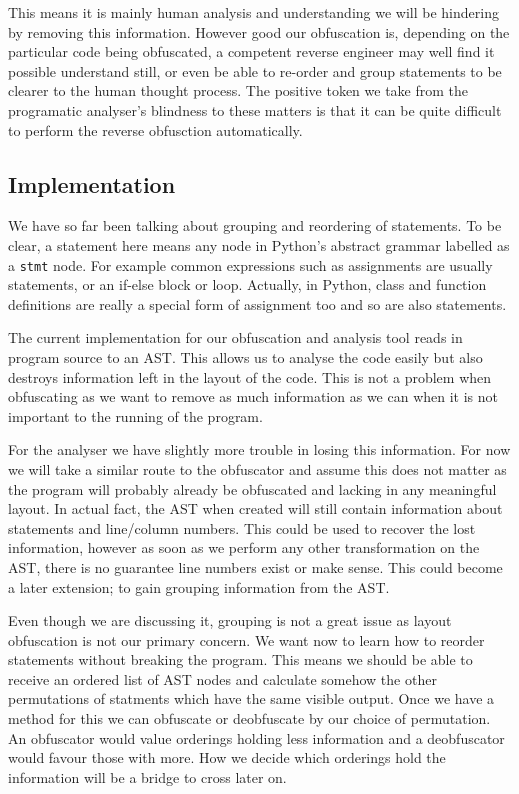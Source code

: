 \documentclass{report}
\begin{document}
This means it is mainly human analysis and understanding we will be hindering by removing this information. However good
our obfuscation is, depending on the particular code being obfuscated, a competent reverse engineer may well find it possible
understand still, or even be able to re-order and group statements to be clearer to the human thought process. The positive token
we take from the programatic analyser's blindness to these matters is that it can be quite difficult to perform
the reverse obfusction automatically.

\subsection{Implementation}

We have so far been talking about grouping and reordering of statements. To be clear, a statement here means any node in Python's abstract
grammar \cite{pyagrammar} labelled as a \texttt{stmt} node. For example common expressions such as assignments are usually statements, or
an if-else block or loop. Actually, in Python, class and function definitions are really a special form of assignment too and so are also statements.

The current implementation for our obfuscation and analysis tool reads in program source to an AST. This allows us to analyse the code easily
but also destroys information left in the layout of the code. This is not a problem when obfuscating as we want to remove as much information
as we can when it is not important to the running of the program.

For the analyser we have slightly more trouble in losing this information. For now we will take a similar route to the obfuscator and assume this
does not matter as the program will probably already be obfuscated and lacking in any meaningful layout. In actual fact, the AST when created
will still contain information about statements and line/column numbers. This could be used to recover the lost information, however as soon
as we perform any other transformation on the AST, there is no guarantee line numbers exist or make sense. This could become a later extension;
to gain grouping information from the AST.

Even though we are discussing it, grouping is not a great issue as layout obfuscation is not our primary concern. We want now to learn how
to reorder statements without breaking the program. This means we should be able to receive an ordered list of AST nodes and calculate somehow
the other permutations of statments which have the same visible output. Once we have a method for this we can obfuscate or deobfuscate by our choice
of permutation. An obfuscator would value orderings holding less information and a deobfuscator would favour those with more. How we decide which
orderings hold the information will be a bridge to cross later on.
\end{document}
